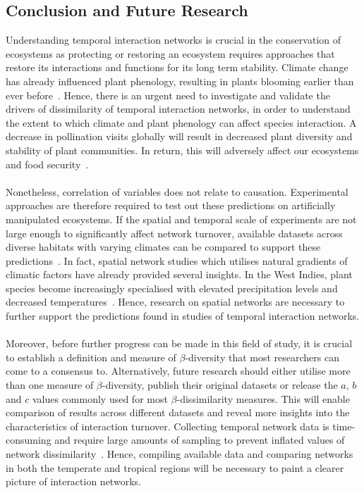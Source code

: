 \documentclass[11pt]{article}
\begin{document}
\subsection{Conclusion and Future Research}
Understanding temporal interaction networks is crucial in the conservation of ecosystems as protecting or restoring an ecosystem requires approaches that restore its interactions and functions for its long term stability. Climate change has already influenced plant phenology, resulting in plants blooming earlier than ever before~\citep{Cleland2007,Miller-Rushing2008}. Hence, there is an urgent need to investigate and validate the drivers of dissimilarity of temporal interaction networks, in order to understand the extent to which climate and plant phenology can affect species interaction. A decrease in pollination visits globally will result in decreased plant diversity and stability of plant communities. In return, this will adversely affect our ecosystems and food security~\citep{Schweiger2010, Burkle2011}. \\
\\
Nonetheless, correlation of variables does not relate to causation. Experimental approaches are therefore required to test out these predictions on artificially manipulated ecosystems. If the spatial and temporal scale of experiments are not large enough to significantly affect network turnover, available datasets across diverse habitats with varying climates can be compared to support these predictions~\citep{Burkle2009, Burkle2011}. In fact, spatial network studies which utilises natural gradients of climatic factors have already provided several insights. In the West Indies, plant species become increasingly specialised with elevated precipitation levels and decreased temperatures~\citep{MartinGonzalez2009}. Hence, research on spatial networks are necessary to further support the predictions found in studies of temporal interaction networks.\\
\\
Moreover, before further progress can be made in this field of study, it is crucial to establish a definition and measure of $\beta$-diversity that most researchers can come to a consensus to. Alternatively, future research should either utilise more than one measure of $\beta$-diversity, publish their original datasets or release the $a$, $b$ and $c$ values commonly used for most $\beta$-dissimilarity measures. This will enable comparison of results across different datasets and reveal more insights into the characteristics of interaction turnover. Collecting temporal network data is time-consuming and require large amounts of sampling to prevent inflated values of network dissimilarity~\citep{Koleff2003, Burkle2011, Poisot2015}. Hence, compiling available data and comparing networks in both the temperate and tropical regions will be necessary to paint a clearer picture of interaction networks. \\
\end{document}
